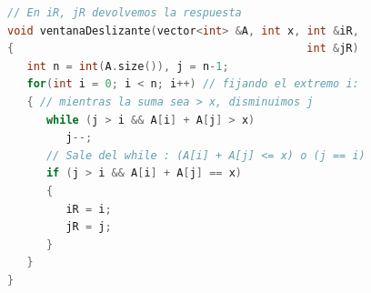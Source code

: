 \documentclass{beamer}
\begin{document}
\ventanaDeslizanteDOSSUM
{
{\fontsize{9.5pt}{11.4pt}
	\begin{lstlisting}[language=C++,basicstyle=\ttfamily,keywordstyle=\color{NavyBlue}, commentstyle=\color{Mahogany}\ttfamily,]
// En iR, jR devolvemos la respuesta
void ventanaDeslizante(vector<int> &A, int x, int &iR,  
{                                             int &jR) 
   int n = int(A.size()), j = n-1;
   for(int i = 0; i < n; i++) // fijando el extremo i:
   { // mientras la suma sea > x, disminuimos j
      while (j > i && A[i] + A[j] > x) 
         j--;
      // Sale del while : (A[i] + A[j] <= x) o (j == i)
      if (j > i && A[i] + A[j] == x)
      {
         iR = i;
         jR = j;
      } 
   }
}
	\end{lstlisting}
}
}

\frame{\titlepage}


\end{document}
